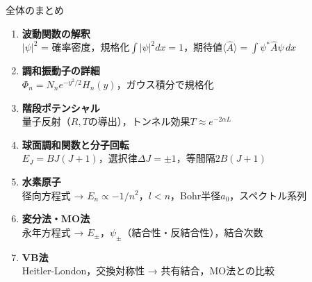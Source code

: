 \documentclass[aspectratio=169, 11pt]{beamer}
\begin{document}
\begin{frame}[shrink=5]{全体のまとめ}

\begin{enumerate}
  \item \textbf{波動関数の解釈}\\
    $|\psi|^2$ = 確率密度，規格化$\int|\psi|^2 dx = 1$，期待値$\langle\hat{A}\rangle = \int\psi^*\hat{A}\psi\,dx$

  \item \textbf{調和振動子の詳細}\\
    $\Phi_n = N_n e^{-y^2/2}H_n(y)$，ガウス積分で規格化

  \item \textbf{階段ポテンシャル}\\
    量子反射（$R,T$の導出），トンネル効果$T \approx e^{-2\alpha L}$

  \item \textbf{球面調和関数と分子回転}\\
    $E_J = BJ(J+1)$，選択律$\Delta J = \pm 1$，等間隔$2B(J+1)$

  \item \textbf{水素原子}\\
    径向方程式 → $E_n \propto -1/n^2$，$l < n$，Bohr半径$a_0$，スペクトル系列

  \item \textbf{変分法・MO法}\\
    永年方程式 → $E_\pm$，$\psi_\pm$（結合性・反結合性），結合次数

  \item \textbf{VB法}\\
    Heitler-London，交換対称性 → 共有結合，MO法との比較
\end{enumerate}
\end{frame}
\end{document}

